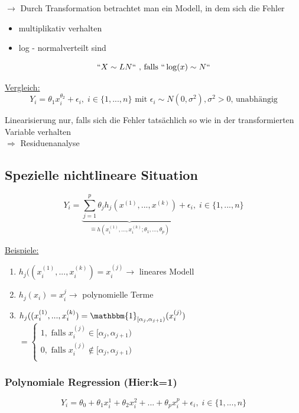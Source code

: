 \documentclass[10pt]{report}
\theoremstyle{definition}
\begin{document}
$\rightarrow$ Durch Transformation betrachtet man ein Modell, in dem sich die Fehler
\begin{itemize}
 \item multiplikativ verhalten
 \item log - normalverteilt sind
\end{itemize}

\[``X \sim LN`` \text{ , falls } `` \log (x) \sim N `` \]

\underline{Vergleich:}
\[ Y_i= \theta_1 x_i^{\theta_2} + \epsilon_i , \; i \in \{1,...,n\} \text{ mit } \epsilon_i \sim N(0, \sigma^2), \sigma^2 > 0 \text{, unabhängig} \]

Linearisierung nur, falls sich die Fehler tatsächlich so wie in der transformierten Variable verhalten \\
$\Rightarrow$ Residuenanalyse

\subsection{Spezielle nichtlineare Situation}

\[Y_i = \underbrace{
\sum_{j=1}^{p} \theta_j h_j (x^{(1)},...,x^{(k)} )}
_{\mathrel{\widehat{=}}  h (x_i^{(1)},...,x_i^{(k)}; \theta_1,..., \theta_p) }
+ \epsilon_i , \; i \in \{1,...,n\} \]

\underline{Beispiele:}
\begin{enumerate} 
 \item $h_j((x_i^{(1)},...,x_i^{(k)}) = x_i^{(j)} \rightarrow$  lineares Modell
 \item $h_j(x_i) = x_i^{j} \rightarrow$ polynomielle Terme
 \item $h_j((x_i^{(1)},...,x_i^{(k)}) = \mathbbm{1}_{[\alpha_j,\alpha_{j+1})} (x_i^{(j)})$ \\
 $= \begin{cases}
 1, \text{ falls } x_i^{(j)} \in [\alpha_j,\alpha_{j+1}) \\
 0, \text{ falls } x_i^{(j)} \notin [\alpha_j,\alpha_{j+1}) \\
 \end{cases}$
\end{enumerate}

\subsubsection{Polynomiale Regression (Hier:k=1)}
\[Y_i = \theta_0 + \theta_1 x_i^1 +  \theta_2 x_i^2 + ... +  \theta_p x_i^p + \epsilon_i, \; i \in \{1,...,n\} \]
\end{document}
